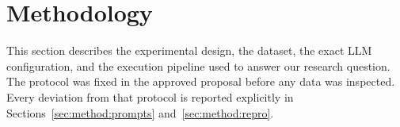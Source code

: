 %
%
%
%
%

\section{Methodology}\label{sec:method}

This section describes the experimental design, the dataset, the exact
LLM configuration, and the execution pipeline used to answer our
research question. The protocol was fixed in the approved proposal
before any data was inspected. Every deviation from that protocol is
reported explicitly in Sections~\ref{sec:method:prompts}
and~\ref{sec:method:repro}.

